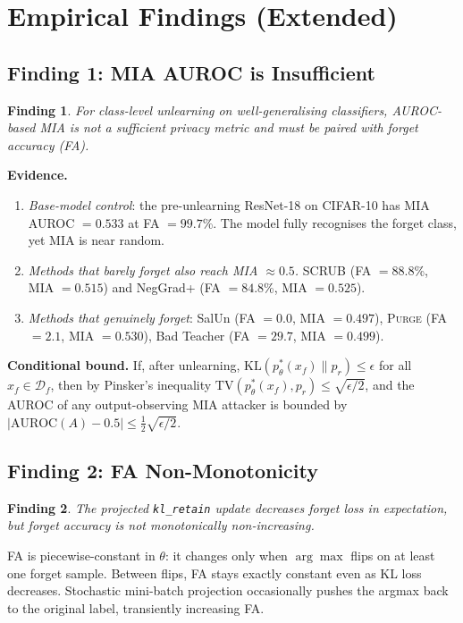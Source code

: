\documentclass[letterpaper]{article}
\newcommand{\ours}{\textsc{Purge}}
\newcommand{\klr}{\texttt{kl\_retain}}
\newcommand{\KL}{\mathrm{KL}}
\newcommand{\Df}{\mathcal{D}_f}
\newtheorem{finding}{Finding}
\begin{document}
\section{Empirical Findings (Extended)}

\subsection{Finding 1: MIA AUROC is Insufficient}

\begin{finding}
For class-level unlearning on well-generalising classifiers, AUROC-based MIA is not a sufficient privacy metric and must be paired with forget accuracy (FA).
\end{finding}

\textbf{Evidence.}
\begin{enumerate}[nosep]
\item \emph{Base-model control}: the pre-unlearning ResNet-18 on CIFAR-10 has MIA AUROC $= 0.533$ at FA $= 99.7$\%. The model fully recognises the forget class, yet MIA is near random.
\item \emph{Methods that barely forget also reach MIA $\approx 0.5$.} SCRUB (FA $= 88.8$\%, MIA $= 0.515$) and NegGrad+ (FA $= 84.8$\%, MIA $= 0.525$).
\item \emph{Methods that genuinely forget}: SalUn (FA $= 0.0$, MIA $= 0.497$), \ours{} (FA $= 2.1$, MIA $= 0.530$), Bad Teacher (FA $= 29.7$, MIA $= 0.499$).
\end{enumerate}

\textbf{Conditional bound.} If, after unlearning, $\KL(p_\theta^*(x_f) \| p_r) \le \epsilon$ for all $x_f \in \Df$, then by Pinsker's inequality $\mathrm{TV}(p_\theta^*(x_f), p_r) \le \sqrt{\epsilon/2}$, and the AUROC of any output-observing MIA attacker is bounded by $|\mathrm{AUROC}(A) - 0.5| \le \frac{1}{2}\sqrt{\epsilon/2}$.

\subsection{Finding 2: FA Non-Monotonicity}

\begin{finding}
The projected \klr{} update decreases forget loss in expectation, but forget \emph{accuracy} is not monotonically non-increasing.
\end{finding}

FA is piecewise-constant in $\theta$: it changes only when $\arg\max$ flips on at least one forget sample. Between flips, FA stays exactly constant even as KL loss decreases. Stochastic mini-batch projection occasionally pushes the argmax back to the original label, transiently increasing FA.
\end{document}
